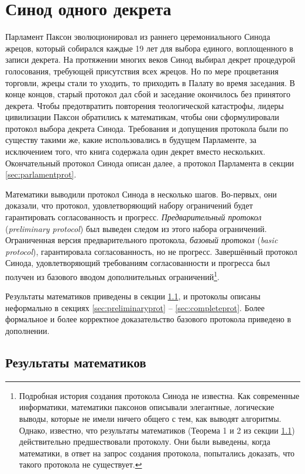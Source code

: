 \documentclass[12pt, a4paper]{article} %
\begin{document}
\section{Синод одного декрета}

Парламент Паксон эволюционировал из раннего церемониального Синода жрецов, который собирался каждые 19 лет для выбора единого, воплощенного в записи декрета. На протяжении многих веков Синод выбирал декрет процедурой голосования, требующей присутствия всех жрецов. Но по мере процветания торговли, жрецы стали то уходить, то приходить в Палату во время заседания. В конце концов, старый протокол дал сбой и заседание окончилось без принятого декрета. Чтобы предотвратить повторения теологической катастрофы, лидеры цивилизации Паксон обратились к математикам, чтобы они сформулировали протокол выбора декрета Синода. Требования и допущения протокола были по существу такими же, какие использовались в будущем Парламенте, за исключением того, что книга содержала один декрет вместо нескольких. Окончательный протокол Синода описан далее, а протокол Парламента в секции \ref{sec:parlamentprot}.

Математики выводили протокол Синода в несколько шагов. Во-первых, они доказали, что протокол, удовлетворяющий набору ограничений будет гарантировать согласованность  и прогресс. \textit{Предварительный протокол} (\textit{preliminary protocol}) был выведен следом из этого набора ограничений. Ограниченная  версия предварительного протокола, \textit{базовый протокол} (\textit{basic protocol}), гарантировала согласованность, но не прогресс. Завершённый протокол Синода, удовлетворяющий требованиям согласованности и прогресса был получен из базового вводом дополнительных ограничений\footnote{Подробная история создания протокола Синода не известна. Как современные информатики, математики паксонов описывали элегантные, логические выводы, которые не имели ничего общего с тем, как выводят алгоритмы. Однако, известно, что результаты математиков (Теорема 1 и 2 из секции \ref{sec:mathsupport}) действительно предшествовали протоколу. Они были выведены, когда математики, в ответ на запрос создания протокола, попытались доказать, что такого протокола не существует.
}.

Результаты математиков приведены в секции \ref{sec:mathsupport}, и протоколы описаны неформально в секциях \ref{sec:preliminaryprot} -- \ref{sec:completeprot}. Более формальное и более корректное доказательство базового протокола приведено в дополнении.
\newpage
\subsection{Результаты математиков}\label{sec:mathsupport}
\end{document}
